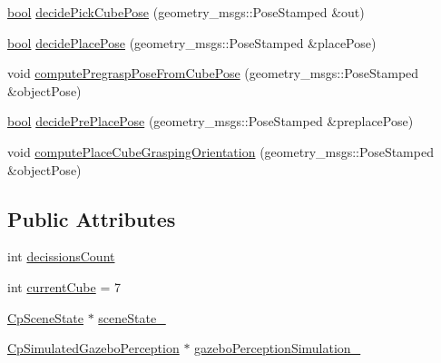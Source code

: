 \begin{DoxyCompactItemize}
\item 
\hyperlink{classbool}{bool} \hyperlink{classsm__fetch__two__table__whiskey__pour_1_1cl__perception__system_1_1ClPerceptionSystem_a99a0106b684b9e8b3751906388be478d}{decide\+Pick\+Cube\+Pose} (geometry\+\_\+msgs\+::\+Pose\+Stamped \&out)
\item 
\hyperlink{classbool}{bool} \hyperlink{classsm__fetch__two__table__whiskey__pour_1_1cl__perception__system_1_1ClPerceptionSystem_a803c5d30981b6368e854dd9e8972f129}{decide\+Place\+Pose} (geometry\+\_\+msgs\+::\+Pose\+Stamped \&place\+Pose)
\item 
void \hyperlink{classsm__fetch__two__table__whiskey__pour_1_1cl__perception__system_1_1ClPerceptionSystem_a248ea58583957d1260c4443008eba35b}{compute\+Pregrasp\+Pose\+From\+Cube\+Pose} (geometry\+\_\+msgs\+::\+Pose\+Stamped \&object\+Pose)
\item 
\hyperlink{classbool}{bool} \hyperlink{classsm__fetch__two__table__whiskey__pour_1_1cl__perception__system_1_1ClPerceptionSystem_aa357d56583dd51b137384b8d15cbf308}{decide\+Pre\+Place\+Pose} (geometry\+\_\+msgs\+::\+Pose\+Stamped \&preplace\+Pose)
\item 
void \hyperlink{classsm__fetch__two__table__whiskey__pour_1_1cl__perception__system_1_1ClPerceptionSystem_a349d7fbb4a63fcfed8ccef0d9e18c7e5}{compute\+Place\+Cube\+Grasping\+Orientation} (geometry\+\_\+msgs\+::\+Pose\+Stamped \&object\+Pose)
\end{DoxyCompactItemize}
\subsection*{Public Attributes}
\begin{DoxyCompactItemize}
\item 
int \hyperlink{classsm__fetch__two__table__whiskey__pour_1_1cl__perception__system_1_1ClPerceptionSystem_af0ae8482802a57220d628dbe692c1c6f}{decissions\+Count}
\item 
int \hyperlink{classsm__fetch__two__table__whiskey__pour_1_1cl__perception__system_1_1ClPerceptionSystem_ae587d77404f6518bb1f6cf8e835aa3e9}{current\+Cube} = 7
\item 
\hyperlink{classsm__fetch__two__table__whiskey__pour_1_1cl__perception__system_1_1CpSceneState}{Cp\+Scene\+State} $\ast$ \hyperlink{classsm__fetch__two__table__whiskey__pour_1_1cl__perception__system_1_1ClPerceptionSystem_af60dc69df392f4bb2aae7220dd0ff847}{scene\+State\+\_\+}
\item 
\hyperlink{classsm__fetch__two__table__whiskey__pour_1_1cl__perception__system_1_1CpSimulatedGazeboPerception}{Cp\+Simulated\+Gazebo\+Perception} $\ast$ \hyperlink{classsm__fetch__two__table__whiskey__pour_1_1cl__perception__system_1_1ClPerceptionSystem_a8dfacb8944f2bb24958668539c72a026}{gazebo\+Perception\+Simulation\+\_\+}
\end{DoxyCompactItemize}
